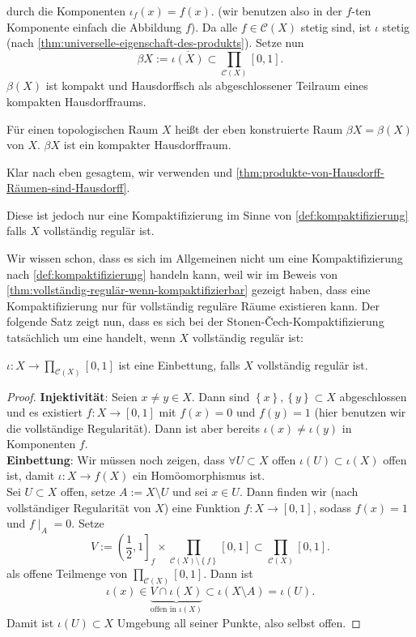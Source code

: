 durch die Komponenten $ι_f(x) = f(x)$. (wir benutzen also in der  $f$-ten Komponente einfach die Abbildung  $f$). Da alle  $f\in \mathcal{C}(X)$ stetig sind, ist $ι$ stetig (nach \autoref{thm:universelle-eigenschaft-des-produkts}). Setze nun
\[
    βX := \overline{ι(X)} \subset \prod_{\mathcal{C}(X)} [0,1]
.\] 
$β(X)$ ist kompakt und Hausdorffsch als abgeschlossener Teilraum eines kompakten Hausdorffraums. \\
\begin{theoremdef**}
    Für einen topologischen Raum $X$ heißt der eben konstruierte Raum $βX = β(X)$  von $X$. $\beta X$ ist ein kompakter Hausdorffraum.
\end{theoremdef**}
\begin{proof*}
    Klar nach eben gesagtem, wir verwenden  und \autoref{thm:produkte-von-Hausdorff-Räumen-sind-Hausdorff}.
\end{proof*}
\begin{warning}
Diese ist jedoch nur eine Kompaktifizierung im Sinne von \autoref{def:kompaktifizierung} falls $X$ vollständig regulär ist.
\end{warning}
\begin{remark*}
    Wir wissen schon, dass es sich im Allgemeinen nicht um eine Kompaktifizierung nach \autoref{def:kompaktifizierung} handeln kann, weil wir im Beweis von \autoref{thm:vollständig-regulär-wenn-kompaktifizierbar} gezeigt haben, dass eine Kompaktifizierung nur für vollständig reguläre Räume existieren kann. Der folgende Satz zeigt nun, dass es sich bei der Stonen-Čech-Kompaktifizierung tatsächlich um eine handelt, wenn $X$ vollständig regulär ist:
\end{remark*}
\begin{theorem}\label{thm:stone-cech-kompaktifizierung-ist-einbettung-für-vollständig-reguläre-räume}
     $ι: X \to  \prod_{\mathcal{C}(X)}[0,1]$ ist eine Einbettung, falls $X$ vollständig regulär ist.
\end{theorem}
\begin{proof}
    \textbf{Injektivität}: Seien $x\neq y\in X$. Dann sind $\left \{x\right\} ,\left \{y\right\} \subset X$ abgeschlossen und es existiert $f: X \to  [0,1]$ mit $f(x) = 0$ und  $f(y) = 1$ (hier benutzen wir die vollständige Regularität). Dann ist aber bereits  $ι(x) \neq  ι(y)$ in Komponenten $f$. \\
    \textbf{Einbettung}: Wir müssen noch zeigen, dass $\forall  U\subset X$ offen $ι(U) \subset ι(X)$ offen ist, damit $ι : X \to  f(X)$ ein Homöomorphismus ist. \\
    Sei $U\subset X$ offen, setze $A := X\setminus U$ und sei $x\in U$. Dann finden wir (nach vollständiger Regularität von $X$) eine Funktion  $f: X \to  [0,1]$, sodass $f(x) = 1$ und  $f\mid _{A} = 0$. Setze
    \[
        V := \left( \frac{1}{2},1 \right]_f \times \prod_{\mathcal{C}(X) \setminus \left \{f\right\} } [0,1] \subset \prod_{\mathcal{C}(X)} [0,1]
    .\] 
    als offene Teilmenge von $\prod_{\mathcal{C}(X)} [0,1]$. Dann ist
    \[
        ι(x) \in \underbrace{V \cap  ι(X)}_{\text{offen in } ι(X)} \subset ι(X \setminus A) = ι(U)
    .\] 
    Damit ist $ι(U)\subset X$ Umgebung all seiner Punkte, also selbst offen.
\end{proof}
